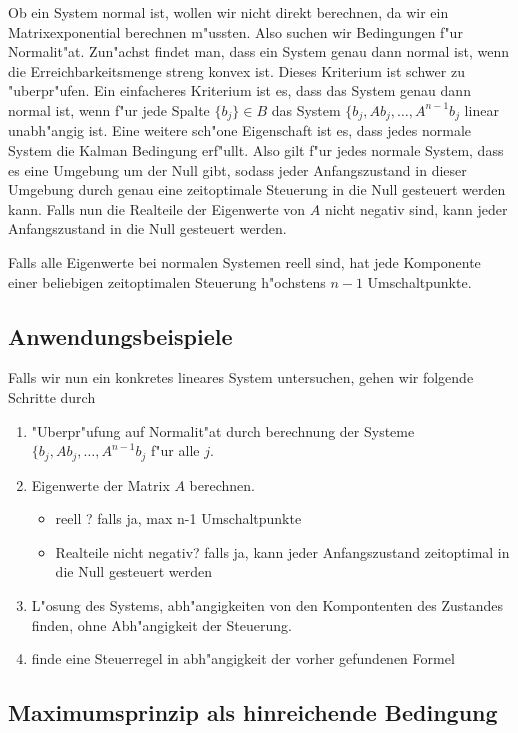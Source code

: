 \documentclass[pdftex,a4paper,oneside]{scrbook}
\begin{document}
Ob ein System normal ist, wollen wir nicht direkt berechnen, da wir ein Matrixexponential berechnen m"ussten. Also suchen wir Bedingungen f"ur Normalit"at. Zun"achst findet man, dass ein System genau dann normal ist, wenn die Erreichbarkeitsmenge streng konvex ist. Dieses Kriterium ist schwer zu "uberpr"ufen. Ein einfacheres Kriterium ist es, dass das System genau dann normal ist, wenn f"ur jede Spalte $\{b_j\} \in B$ das System $ \{b_j, A b_j, \dots, A^{n-1} b_j$ linear unabh"angig ist.  
Eine weitere sch"one Eigenschaft ist es, dass jedes normale System die Kalman Bedingung erf"ullt. 
Also gilt f"ur jedes normale System, dass es eine Umgebung um der Null gibt, sodass jeder Anfangszustand in dieser Umgebung durch genau eine zeitoptimale Steuerung in die Null gesteuert werden kann. Falls nun die Realteile der Eigenwerte von $A$ nicht negativ sind, kann jeder Anfangszustand in die Null gesteuert werden. 

Falls alle Eigenwerte bei normalen Systemen reell sind, hat jede Komponente einer beliebigen zeitoptimalen Steuerung h"ochstens $n-1$ Umschaltpunkte. 

\subsection{Anwendungsbeispiele}
Falls wir nun ein konkretes lineares System untersuchen, gehen wir folgende Schritte durch
\begin{enumerate}
	\item "Uberpr"ufung auf Normalit"at durch berechnung der Systeme $ \{b_j, A b_j, \dots, A^{n-1} b_j$ f"ur alle $j$. 
	\item Eigenwerte der Matrix $A$ berechnen. 
	\begin{itemize}
		\item reell ? falls ja, max n-1 Umschaltpunkte
		\item Realteile nicht negativ? falls ja, kann jeder Anfangszustand zeitoptimal in die Null gesteuert werden
	\end{itemize}
	\item L"osung des Systems, abh"angigkeiten von den Kompontenten des Zustandes finden, ohne Abh"angigkeit der Steuerung. 
	\item finde eine Steuerregel in abh"angigkeit der vorher gefundenen Formel
\end{enumerate}

\subsection{Maximumsprinzip als hinreichende Bedingung}
\end{document}
